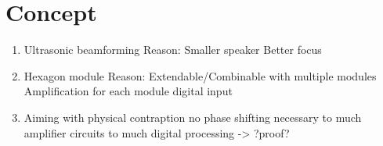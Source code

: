 \chapter{Concept}

\begin{enumerate}
  \item Ultrasonic beamforming
  \subitem Reason:
  \subsubitem Smaller speaker
  \subsubitem Better focus
  \item Hexagon module
  \subitem Reason:
  \subsubitem Extendable/Combinable with multiple modules
  \subitem Amplification for each module
  \subitem digital input
  \item Aiming with physical contraption
  \subitem no phase shifting necessary
  \subsubitem to much amplifier circuits
  \subsubitem to much digital processing -> ?proof?
\end{enumerate}